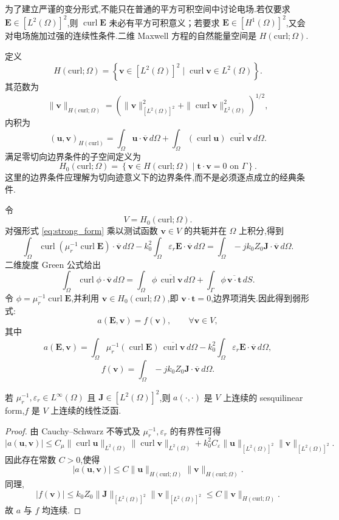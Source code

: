 \documentclass[12pt,hyperref,a4paper,UTF8,twoside]{ctexart}
\newcommand{\curl}{\operatorname{curl}}
\newcommand{\E}{\bm{E}}
\newcommand{\J}{\bm{J}}
\newcommand{\tvec}{\bm{t}}
\begin{document}
为了建立严谨的变分形式,不能只在普通的平方可积空间中讨论电场.若仅要求 $\E\in [L^2(\Omega)]^2$,则 $\curl\E$ 未必有平方可积意义；若要求 $\E\in [H^1(\Omega)]^2$,又会对电场施加过强的连续性条件.二维 Maxwell 方程的自然能量空间是 $H(\text{curl};\Omega)$.

\begin{Definition}
定义
\[
H(\text{curl};\Omega)
=
\left\{
\bm{v}\in [L^2(\Omega)]^2
\mid
\curl\bm{v}\in L^2(\Omega)
\right\}.
\]
其范数为
\[
\|\bm{v}\|_{H(\text{curl};\Omega)}
=
\left(
\|\bm{v}\|_{[L^2(\Omega)]^2}^2
+
\|\curl\bm{v}\|_{L^2(\Omega)}^2
\right)^{1/2},
\]
内积为
\[
(\bm{u},\bm{v})_{H(\text{curl})}
=
\int_\Omega
\bm{u}\cdot\overline{\bm{v}}\,d\Omega
+
\int_\Omega
(\curl\bm{u})\,\overline{\curl\bm{v}}\,d\Omega.
\]
满足零切向边界条件的子空间定义为
\[
H_0(\text{curl};\Omega)
=
\left\{
\bm{v}\in H(\text{curl};\Omega)
\mid
\tvec\cdot\bm{v}=0 \text{ on } \Gamma
\right\}.
\]
这里的边界条件应理解为切向迹意义下的边界条件,而不是必须逐点成立的经典条件.
\end{Definition}

令
\[
V=H_0(\text{curl};\Omega).
\]
对强形式 \eqref{eq:strong_form} 乘以测试函数 $\bm{v}\in V$ 的共轭并在 $\Omega$ 上积分,得到
\[
\int_\Omega
\curl(\mu_r^{-1}\curl\E)\cdot\overline{\bm{v}}\,d\Omega
-
k_0^2
\int_\Omega
\varepsilon_r\E\cdot\overline{\bm{v}}\,d\Omega
=
\int_\Omega
-jk_0Z_0\J\cdot\overline{\bm{v}}\,d\Omega.
\]
二维旋度 Green 公式给出
\[
\int_\Omega
\curl\phi\cdot\overline{\bm{v}}\,d\Omega
=
\int_\Omega
\phi\,\overline{\curl\bm{v}}\,d\Omega
+
\int_\Gamma
\phi\,\overline{\bm{v}\cdot\tvec}\,dS.
\]
令 $\phi=\mu_r^{-1}\curl\E$,并利用 $\bm{v}\in H_0(\text{curl};\Omega)$,即 $\bm{v}\cdot\tvec=0$,边界项消失.因此得到弱形式:
\begin{equation}
\label{eq:weak_form}
a(\E,\bm{v})=f(\bm{v}),
\qquad \forall \bm{v}\in V,
\end{equation}
其中
\[
a(\E,\bm{v})
=
\int_\Omega
\mu_r^{-1}
(\curl\E)\,\overline{\curl\bm{v}}\,d\Omega
-
k_0^2
\int_\Omega
\varepsilon_r
\E\cdot\overline{\bm{v}}\,d\Omega,
\]
\[
f(\bm{v})
=
\int_\Omega
-jk_0Z_0
\J\cdot\overline{\bm{v}}\,d\Omega.
\]

\begin{Theorem}[弱形式的连续性]
若 $\mu_r^{-1},\varepsilon_r\in L^\infty(\Omega)$ 且 $\J\in [L^2(\Omega)]^2$,则 $a(\cdot,\cdot)$ 是 $V$ 上连续的 sesquilinear form,$f$ 是 $V$ 上连续的线性泛函.
\end{Theorem}

\begin{proof}
由 Cauchy--Schwarz 不等式及 $\mu_r^{-1},\varepsilon_r$ 的有界性可得
\[
|a(\bm{u},\bm{v})|
\le
C_\mu
\|\curl\bm{u}\|_{L^2(\Omega)}
\|\curl\bm{v}\|_{L^2(\Omega)}
+
k_0^2C_\varepsilon
\|\bm{u}\|_{[L^2(\Omega)]^2}
\|\bm{v}\|_{[L^2(\Omega)]^2}.
\]
因此存在常数 $C>0$,使得
\[
|a(\bm{u},\bm{v})|
\le
C
\|\bm{u}\|_{H(\text{curl};\Omega)}
\|\bm{v}\|_{H(\text{curl};\Omega)}.
\]
同理,
\[
|f(\bm{v})|
\le
k_0Z_0
\|\J\|_{[L^2(\Omega)]^2}
\|\bm{v}\|_{[L^2(\Omega)]^2}
\le
C
\|\bm{v}\|_{H(\text{curl};\Omega)}.
\]
故 $a$ 与 $f$ 均连续.
\end{proof}
\end{document}
